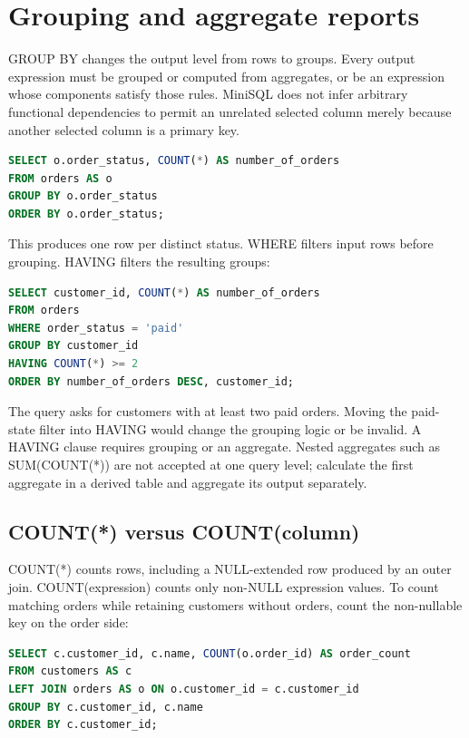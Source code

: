 \section{Grouping and aggregate reports}
\label{sql:grouping}

GROUP BY changes the output level from rows to groups. Every output expression must be grouped or computed from aggregates, or be an expression whose components satisfy those rules. MiniSQL does not infer arbitrary functional dependencies to permit an unrelated selected column merely because another selected column is a primary key.

\begin{lstlisting}[language=SQL]
SELECT o.order_status, COUNT(*) AS number_of_orders
FROM orders AS o
GROUP BY o.order_status
ORDER BY o.order_status;
\end{lstlisting}

This produces one row per distinct status. WHERE filters input rows before grouping. HAVING filters the resulting groups:

\begin{lstlisting}[language=SQL]
SELECT customer_id, COUNT(*) AS number_of_orders
FROM orders
WHERE order_status = 'paid'
GROUP BY customer_id
HAVING COUNT(*) >= 2
ORDER BY number_of_orders DESC, customer_id;
\end{lstlisting}

The query asks for customers with at least two paid orders. Moving the paid-state filter into HAVING would change the grouping logic or be invalid. A HAVING clause requires grouping or an aggregate. Nested aggregates such as SUM(COUNT(*)) are not accepted at one query level; calculate the first aggregate in a derived table and aggregate its output separately.

\subsection{COUNT(*) versus COUNT(column)}

COUNT(*) counts rows, including a NULL-extended row produced by an outer join. COUNT(expression) counts only non-NULL expression values. To count matching orders while retaining customers without orders, count the non-nullable key on the order side:

\begin{lstlisting}[language=SQL]
SELECT c.customer_id, c.name, COUNT(o.order_id) AS order_count
FROM customers AS c
LEFT JOIN orders AS o ON o.customer_id = c.customer_id
GROUP BY c.customer_id, c.name
ORDER BY c.customer_id;
\end{lstlisting}

